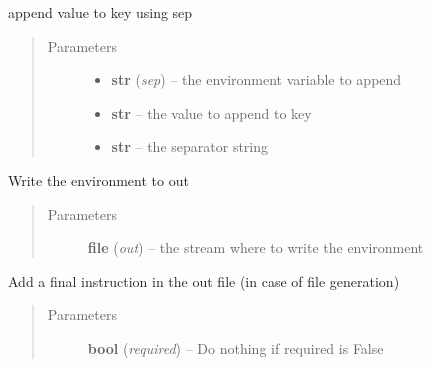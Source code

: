 \documentclass[a4paper,10pt,english]{sphinxmanual}
\begin{document}
\begin{fulllineitems}
\begin{fulllineitems}
\begin{quote}
\begin{description}
\end{description}\end{quote}

\end{fulllineitems}


\begin{fulllineitems}
\label{commands/apidoc/src:src.environment.SalomeEnviron.append}
append value to key using sep
\begin{quote}\begin{description}
\item[{Parameters}] \leavevmode\begin{itemize}
\item {} 
\textbf{str} (\emph{sep}) -- the environment variable to append

\item {} 
\textbf{str} -- the value to append to key

\item {} 
\textbf{str} -- the separator string

\end{itemize}

\end{description}\end{quote}

\end{fulllineitems}


\begin{fulllineitems}
\label{commands/apidoc/src:src.environment.SalomeEnviron.dump}
Write the environment to out
\begin{quote}\begin{description}
\item[{Parameters}] \leavevmode
\textbf{file} (\emph{out}) -- the stream where to write the environment

\end{description}\end{quote}

\end{fulllineitems}


\begin{fulllineitems}
\label{commands/apidoc/src:src.environment.SalomeEnviron.finish}
Add a final instruction in the out file (in case of file generation)
\begin{quote}\begin{description}
\item[{Parameters}] \leavevmode
\textbf{bool} (\emph{required}) -- Do nothing if required is False


\end{description}
\end{quote}
\end{fulllineitems}
\end{fulllineitems}
\end{document}
